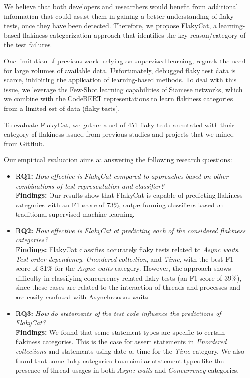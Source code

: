 We believe that both developers and researchers would benefit from additional information that could assist them in gaining a better understanding of flaky tests, once they have been detected. Therefore, we propose FlakyCat, a learning-based flakiness categorization approach that identifies the key reason/category of the test failures. 

One limitation of previous work, relying on supervised learning, regards the need for large volumes of available data. Unfortunately, debugged flaky test data is scarce, inhibiting the application of learning-based methods. To deal with this issue, we leverage the Few-Shot learning capabilities of Siamese networks, which we combine with the CodeBERT representations to learn flakiness categories from a limited set of data (flaky tests). 

To evaluate FlakyCat, we gather a set of 451 flaky tests annotated with their category of flakiness issued from previous studies and projects that we mined from GitHub.

Our empirical evaluation aims at answering the following research questions:

\begin{itemize}[label={}]
    \item \textsc{\textbf{RQ1:}} \emph{How effective is FlakyCat compared to approaches based on other combinations of test representation and classifier?} \\
    \textbf{Findings:} Our results show that FlakyCat is capable of predicting flakiness categories with an F1 score of 73\%, outperforming classifiers based on traditional supervised machine learning.

    \item \textsc{\textbf{RQ2:}} \emph{How effective is FlakyCat at predicting each of the considered flakiness categories?}\\
    
    \textbf{Findings:} FlakyCat classifies accurately flaky tests related to \textit{Async waits}, \textit{Test order dependency}, \textit{Unordered collection}, and \textit{Time}, with the best F1 score of 81\% for the \textit{Async waits} category. However, the approach shows difficulty in classifying concurrency-related flaky tests (an F1 score of 39\%), since these cases are related to the interaction of threads and processes and are easily confused with Asynchronous waits. 

    \item \textsc{\textbf{RQ3:}} \emph{How do statements of the test code influence the predictions of FlakyCat?}\\
    \textbf{Findings:} We found that some statement types are specific to certain flakiness categories. This is the case for assert statements in \textit{Unordered collections} and statements using date or time for the \textit{Time} category. We also found that some flaky categories have similar statement types like the presence of thread usages in both \textit{Async waits} and \textit{Concurrency} categories.
\end{itemize}

